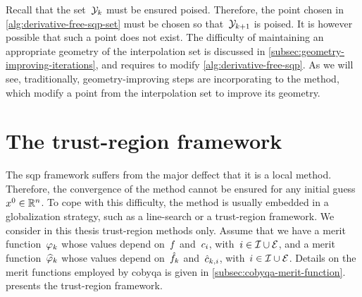 Recall that the set~$\xpt[k]$ must be ensured poised.
Therefore, the point chosen in \cref{alg:derivative-free-sqp-set} must be chosen so that~$\xpt[k + 1]$ is poised.
It is however possible that such a point does not exist.
The difficulty of maintaining an appropriate geometry of the interpolation set is discussed in \cref{subsec:geometry-improving-iterations}, and requires to modify \cref{alg:derivative-free-sqp}.
As we will see, traditionally, geometry-improving steps are incorporating to the method, which modify a point from the interpolation set to improve its geometry.

\section{The trust-region framework}
\label{sec:trust-region}

The \gls{sqp} framework suffers from the major deffect that it is a local method.
Therefore, the convergence of the method cannot be ensured for any initial guess~$\iter[0] \in \R^n$.
To cope with this difficulty, the method is usually embedded in a globalization strategy, such as a line-search or a trust-region framework.
We consider in this thesis trust-region methods only.
Assume that we have a merit function~$\merit[k]$ whose values depend on~$f$ and~$c_{i}$, with~$i \in \mathcal{I} \cup \mathcal{E}$, and a merit function~$\meritm[k]$ whose values depend on~$\objm[k]$ and~$\conm[k]{i}$, with~$i \in \mathcal{I} \cup \mathcal{E}$.
Details on the merit functions employed by \gls{cobyqa} is given in \cref{subsec:cobyqa-merit-function}.
 presents the trust-region framework.

